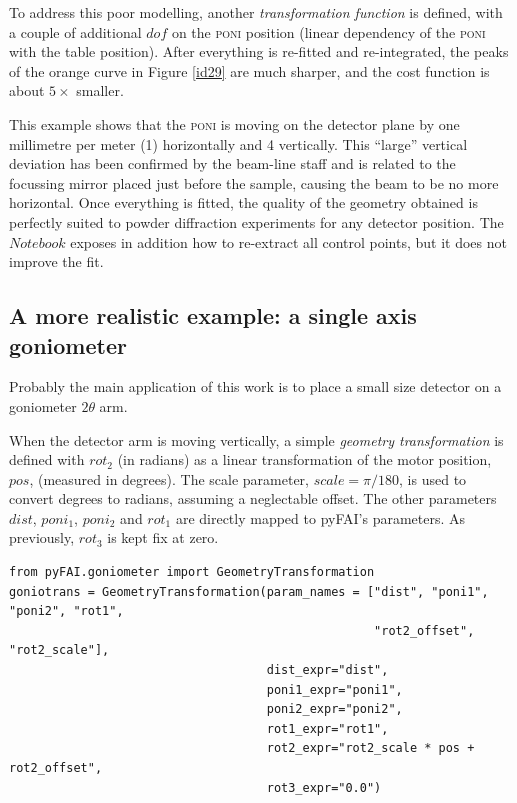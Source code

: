 \documentclass[preprint]{iucr}              %
\begin{document}
 
To address this poor modelling, another \textit{transformation function} is
defined, with a couple of additional $dof$ on the \textsc{poni} position
(linear dependency of the \textsc{poni} with the table position).
After everything is re-fitted and re-integrated, the peaks of the orange curve
in Figure \ref{id29} are much sharper, and the cost function is about $5\times$
smaller. 

This example shows that the \textsc{poni} is moving on the detector
plane by one millimetre per meter (1\textperthousand) horizontally and 
4 \textperthousand vertically.
This ``large'' vertical deviation has been confirmed by the beam-line staff and
is related to the focussing mirror placed just before the sample, causing the
beam to be no more horizontal.
Once everything is fitted, the quality of the geometry obtained is perfectly
suited to powder diffraction experiments for any detector position. The
$Notebook$ exposes in addition how to re-extract all control points, but it
does not improve the fit. 
  
\subsection{A more realistic example: a single axis goniometer}

Probably the main application of this work is to place a small size detector
on a goniometer $2\theta$ arm. 

When the detector arm is moving vertically, a simple \textit{geometry
transformation} is defined with $rot_2$ (in radians) as a
linear transformation of the motor position, $pos$, (measured in degrees).
The scale parameter, $scale = \pi / 180$, is used to convert degrees to radians, 
assuming a neglectable offset.
The other parameters $dist$, $poni_1$, $poni_2$ and $rot_1$ are directly mapped
to pyFAI's parameters.
As previously, $rot_3$ is kept fix at zero.

\begin{verbatim}
from pyFAI.goniometer import GeometryTransformation
goniotrans = GeometryTransformation(param_names = ["dist", "poni1", "poni2", "rot1",
                                                   "rot2_offset", "rot2_scale"],
                                    dist_expr="dist", 
                                    poni1_expr="poni1",
                                    poni2_expr="poni2", 
                                    rot1_expr="rot1", 
                                    rot2_expr="rot2_scale * pos + rot2_offset", 
                                    rot3_expr="0.0")
\end{verbatim}
\end{document}
